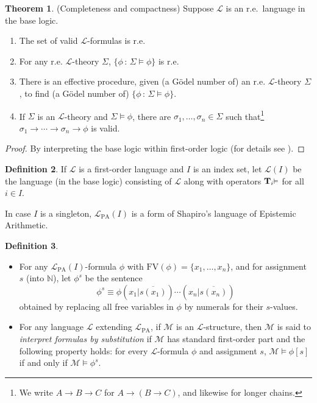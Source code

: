 \documentclass[reqno]{article}
\theoremstyle{definition}
\newtheorem{theorem}{Theorem}
\newtheorem{definition}[theorem]{Definition}
\def\N{\mathbb{N}}
\def\L{\mathscr{L}}
\def\T{\mathbf{T}}
\def\FV{\mathrm{FV}}
\def\LPA{\L_{\mathrm{PA}}}
\renewcommand{\Pr}[1]{\T_{#1}\mbox{\small${\vDash}$}}
\begin{document}
\begin{theorem}
\label{completecompact}
(Completeness and compactness)  Suppose $\L$ is an r.e.~language in the base logic.
\begin{enumerate}
\item The set of valid $\L$-formulas is r.e.
\item For any r.e. $\L$-theory $\Sigma$, $\{\phi\,:\,\Sigma\models\phi\}$ is r.e.
\item There is an effective procedure, given (a G\"odel number of) an r.e.
$\L$-theory $\Sigma$,
to find (a G\"odel number of) $\{\phi\,:\,\Sigma\models\phi\}$.
\item If $\Sigma$ is an $\L$-theory and $\Sigma\models\phi$, there
are $\sigma_1,\ldots,\sigma_n\in\Sigma$ such that\footnote{We write
$A\rightarrow B\rightarrow C$ for $A\rightarrow (B\rightarrow C)$, and likewise for longer
chains.} $\sigma_1\rightarrow\cdots\rightarrow\sigma_n\rightarrow\phi$ is valid.
\end{enumerate}
\end{theorem}

\begin{proof}
By interpreting the base logic within first-order logic (for details see \cite{alexanderdissert}).
\end{proof}

\begin{definition}
\label{selfrefdefn}
If $\L$ is a first-order language and $I$ is an index set, let $\L(I)$ be the
language (in the base logic) consisting of $\L$ along with 
operators $\Pr{i}$ for all $i\in I$.
\end{definition}


In case $I$ is a singleton, $\LPA(I)$ is a form of Shapiro's \cite{shapiro1985}
language of Epistemic Arithmetic.


\begin{definition}
\label{sentencemaker}
\item
\begin{itemize}
\item
For any $\LPA(I)$-formula $\phi$ with $\FV(\phi)=\{x_1,\ldots,x_n\}$, and for
assignment $s$ (into $\N$), let $\phi^s$ be the sentence
\[
\phi^s \equiv \phi(x_1|\overline{s(x_1)})\cdots(x_n|\overline{s(x_n)})
\]
obtained by replacing all free variables in $\phi$ by numerals for their
$s$-values.
\item
For any language $\mathscr L$ extending $\LPA$, if $\mathscr M$ is an
$\mathscr L$-structure, then $\mathscr M$
is said to \emph{interpret formulas by substitution} if $\mathscr M$ has
standard first-order part and the following
property holds: for every $\mathscr L$-formula $\phi$ and assignment $s$,
$\mathscr M\models\phi[s]$ if and only if $\mathscr M\models\phi^s$.
\end{itemize}
\end{definition}
\end{document}
